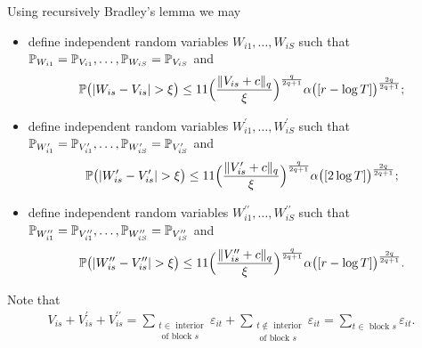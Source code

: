 \documentclass[a4paper,12pt]{article}
\begin{document}
Using recursively Bradley's lemma we may 
\begin{itemize}
\item define independent random variables $W_{i1}, \ldots, W_{iS}$ such that $\mathbb{P}_{W_{i1}} = \mathbb{P}_{V_{i1}}, \ldots, \mathbb{P}_{W_{iS}} = \mathbb{P}_{V_{iS}}$ and 
\begin{align}\label{eq-bradleys-lemma1}
\mathbb{P}\big(|W_{is} - V_{is}| > \xi \big) \le 11 \Big(\frac{\lVert V_{is} + c\rVert_q}{\xi}\Big)^{\frac{q}{2q+1}}\alpha\big([r - \log T]\big)^{\frac{2q}{2q+1}};
\end{align}
\item define independent random variables $W_{i1}^\prime, \ldots, W_{iS}^\prime$ such that $\mathbb{P}_{W_{i1}^\prime} = \mathbb{P}_{V_{i1}^\prime}, \ldots, \mathbb{P}_{W_{iS}^\prime} = \mathbb{P}_{V_{iS}^\prime}$ and 
\begin{align}\label{eq-bradleys-lemma2}
\mathbb{P}\big(|W_{is}^\prime - V_{is}^\prime| > \xi \big) \le 11 \Big(\frac{\lVert V_{is}^\prime + c\rVert_q}{\xi}\Big)^{\frac{q}{2q+1}}\alpha\big([2\log T]\big)^{\frac{2q}{2q+1}};
\end{align}
\item define independent random variables $W_{i1}^{\prime\prime}, \ldots, W_{iS}^{\prime\prime}$ such that $\mathbb{P}_{W_{i1}^{\prime\prime}} = \mathbb{P}_{V_{i1}^{\prime\prime}}, \ldots, \mathbb{P}_{W_{iS}^{\prime\prime}} = \mathbb{P}_{V_{iS}^{\prime\prime}}$ and 
\begin{align}\label{eq-bradleys-lemma3}
\mathbb{P}\big(|W_{is}^{\prime\prime} - V_{is}^{\prime\prime}| > \xi \big) \le 11 \Big(\frac{\lVert V_{is}^{\prime\prime} + c\rVert_q}{\xi}\Big)^{\frac{q}{2q+1}}\alpha\big([r -\log T]\big)^{\frac{2q}{2q+1}}.
\end{align}
\end{itemize}
Note that 
\begin{align*}
V_{is} + V_{is}^{\prime} + V_{is}^{\prime\prime} = \sum_{\substack{t \in \text{ interior} \\ \text{ of block }s}} \varepsilon_{it}+\sum_{\substack{t \notin \text{ interior} \\ \text{ of block }s}} \varepsilon_{it} = 
 \sum_{t \in \text{ block }s} \varepsilon_{it}.
\end{align*}
\end{document}

